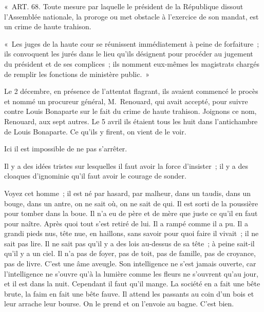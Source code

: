 \documentclass[french,twoside]{book} %
\newenvironment{quoteblock}%
  {\begin{quoting}}
  {\end{quoting}}
\newenvironment{quotebar}{%
    \def\FrameCommand{{\color{rubric!10!}\vrule width 0.5em} \hspace{0.9em}}%
    \def\OuterFrameSep{0pt} %
    \MakeFramed {\advance\hsize-\width \FrameRestore}
  }%
  {%
    \endMakeFramed
  }
\renewenvironment{quoteblock}%
  {%
    \savenotes
    \setstretch{0.9}
    \begin{quotebar}
    \smallskip
  }
  {%
    \smallskip
    \end{quotebar}
    \spewnotes
  }
\begin{document}
\begin{quoteblock}
 \noindent « ART. 68. Toute mesure par laquelle le président de la République dissout l’Assemblée nationale, la proroge ou met obstacle à l’exercice de son mandat, est un crime de haute trahison.\par
 « Les juges de la haute cour se réunissent immédiatement à peine de forfaiture ; ils convoquent les jurés dans le lieu qu’ils désignent pour procéder au jugement du président et de ses complices ; ils nomment eux-mêmes les magistrats chargés de remplir les fonctions de ministère public. »
 \end{quoteblock}

\noindent Le 2 décembre, en présence de l’attentat flagrant, ils avaient commencé le procès et nommé un procureur général, M. Renouard, qui avait accepté, pour suivre contre Louis Bonaparte sur le fait du crime de haute trahison. Joignons ce nom, Renouard, aux sept autres. Le 5 avril ils étaient tous les huit dans l’antichambre de Louis Bonaparte. Ce qu’ils y firent, on vient de le voir.\par
Ici il est impossible de ne pas s’arrêter.\par
Il y a des idées tristes sur lesquelles il faut avoir la force d’insister ; il y a des cloaques d’ignominie qu’il faut avoir le courage de sonder.\par
Voyez cet homme ; il est né par hasard, par malheur, dans un taudis, dans un bouge, dans un antre, on ne sait où, on ne sait de qui. Il est sorti de la poussière pour tomber dans la boue. Il n’a eu de père et de mère que juste ce qu’il en faut pour naître. Après quoi tout s’est retiré de lui. Il a rampé comme il a pu. Il a grandi pieds nus, tête nue, en haillons, sans savoir pour quoi faire il vivait ; il ne sait pas lire. Il ne sait pas qu’il y a des lois au-dessus de sa tête ; à peine sait-il qu’il y a un ciel. Il n’a pas de foyer, pas de toit, pas de famille, pas de croyance, pas de livre. C’est une âme aveugle. Son intelligence ne s’est jamais ouverte, car l’intelligence ne s’ouvre qu’à la lumière comme les fleurs ne s’ouvrent qu’au jour, et il est dans la nuit. Cependant il faut qu’il mange. La société en a fait une bête brute, la faim en fait une bête fauve. Il attend les passants au coin d’un bois et leur arrache leur bourse. On le prend et on l’envoie au bagne. C’est bien.\par
\end{document}
